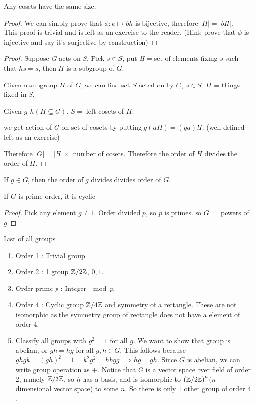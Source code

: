 \begin{lemma}
	Any cosets have the same size.
\end{lemma}
\begin{proof}
    We can simply prove that $\phi: h \mapsto bh$ is bijective, therefore $|H| = |bH|$. \\
    This proof is trivial and is left as an exercise to the reader. (Hint: prove that $\phi$ is injective and say it's surjective by construction)
\end{proof}
\begin{proof}
	Suppose $G$ acts on $S$. Pick $s \in S$, put $H = $set of elements fixing $s$ such that $hs = s$, then $H$ is a subgroup of $G$.

	Given a subgroup $H$ of $G$, we can find set $S$ acted on by $G$, $s \in S$. $H$ = things fixed in $S$.

	Given $g,h (H \subseteq G)$. $S = $ left cosets of $H$. 

	we get action of $G$ on set of cosets by putting $g(aH) = (ga)H$. (well-defined left as an exercise)

	Therefore $|G| = |H| \times $ number of cosets. Therefore the order of $H$ divides the order of $H$.
\end{proof}
\begin{theorem}
	If $g \in G$, then the order of $g$ divides divides order of $G$.
\end{theorem}
\begin{corollary}
	If $G$ is prime order, it is cyclic
\end{corollary}
\begin{proof}
	Pick any element $g \neq 1$. Order divided $p$, so $p$ is primes. so $G = $ powers of $g$
\end{proof}
\begin{example}
	List of all groups
	\begin{enumerate}
		\item Order 1 : Trivial group
		\item Order 2 : 1 group $\mathbb Z/2\mathbb Z$, $0,1$.
		\item Order prime $p$ : Integer $\mod p$.
		\item Order 4 : Cyclic group $\mathbb Z/4 \mathbb Z$ and symmetry of a rectangle. These are not isomorphic as the symmetry group of rectangle does not have a element of order $4$. 

		\item Classify all groups with $g^2 = 1$ for all $g$. We want to show that group is abelian, or $gh = hg$ for all $g,h \in G$. This follows because $ghgh = (gh)^2 = 1 = h^2g^2 = hhgg \implies hg = gh$.		 Since $G$ is abelian, we can write group operation as $+$. Notice that $G$ is a vector space over field of order $2$, namely $\mathbb Z/2 \mathbb Z$. so $h$ has a basis, and is isomorphic to $\left( \mathbb Z/2\mathbb Z\right)^n$($n$-dimensional vector space) to some $n$. So there is only $1$ other group of order $4$.
	\end{enumerate}
\end{example}
